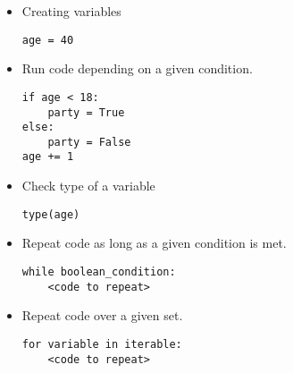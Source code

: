 \documentclass{article}
\begin{document}
\begin{itemize}
\item
  Creating variables

        \begin{verbatim}
age = 40
        \end{verbatim}
\item
  Run code depending on a given condition.


        \begin{verbatim}
if age < 18:
    party = True
else:
    party = False
age += 1
        \end{verbatim}

\item Check type of a variable

        \begin{verbatim}
type(age)
        \end{verbatim}
\item
  Repeat code as long as a given condition is met.

        \begin{verbatim}
while boolean_condition:
    <code to repeat>
        \end{verbatim}

\item
  Repeat code over a given set.


        \begin{verbatim}
for variable in iterable:
    <code to repeat>
        \end{verbatim}
\end{itemize}
\end{document}
